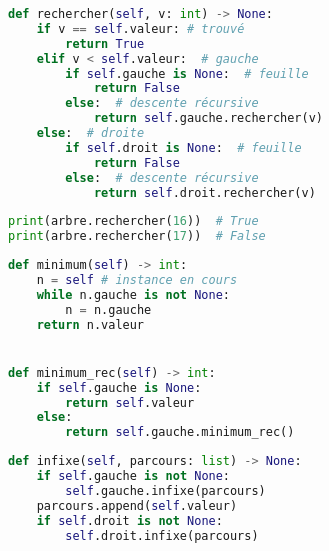 \documentclass[svgnames,11pt]{beamer}
\begin{document}
\begin{frame}[fragile]

\begin{center}
\begin{lstlisting}[language=Python , basicstyle=\ttfamily\small, xleftmargin=0.5em, xrightmargin=0em]
def rechercher(self, v: int) -> None:
    if v == self.valeur: # trouvé
        return True
    elif v < self.valeur:  # gauche
        if self.gauche is None:  # feuille
            return False
        else:  # descente récursive
            return self.gauche.rechercher(v)
    else:  # droite
        if self.droit is None:  # feuille
            return False
        else:  # descente récursive
            return self.droit.rechercher(v)
\end{lstlisting}
\end{center}

\end{frame}
\begin{frame}[fragile]

\begin{center}
\begin{lstlisting}[language=Python , basicstyle=\ttfamily\small, xleftmargin=0.5em, xrightmargin=0em]
print(arbre.rechercher(16))  # True
print(arbre.rechercher(17))  # False
\end{lstlisting}
\end{center}
    
    \end{frame}
\begin{frame}[fragile]

\begin{center}
\begin{lstlisting}[language=Python , basicstyle=\ttfamily\small, xleftmargin=0.5em, xrightmargin=0em]
def minimum(self) -> int:
    n = self # instance en cours
    while n.gauche is not None:
        n = n.gauche
    return n.valeur


def minimum_rec(self) -> int:
    if self.gauche is None:
        return self.valeur
    else:
        return self.gauche.minimum_rec()
\end{lstlisting}
\end{center}

\end{frame}
\begin{frame}[fragile]

\begin{center}
\begin{lstlisting}[language=Python , basicstyle=\ttfamily\small, xleftmargin=0.5em, xrightmargin=-2.5em]
def infixe(self, parcours: list) -> None:
    if self.gauche is not None:
        self.gauche.infixe(parcours)
    parcours.append(self.valeur)
    if self.droit is not None:
        self.droit.infixe(parcours)
\end{lstlisting}
\end{center}
    
    \end{frame}
\end{document}
